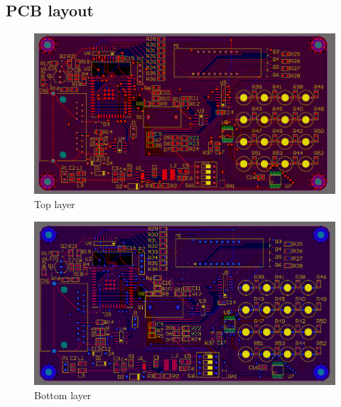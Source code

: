 \subsection{PCB layout}
\begin{figure}[!htbp]
    \centering
    \includegraphics[width=\textwidth]{graphics/section3/f7.PNG}
    \caption{Top layer}
\end{figure}
\FloatBarrier

\begin{figure}[!htbp]
    \centering
    \includegraphics[width=\textwidth]{graphics/section3/f8.PNG}
    \caption{Bottom layer}
\end{figure}
\FloatBarrier
